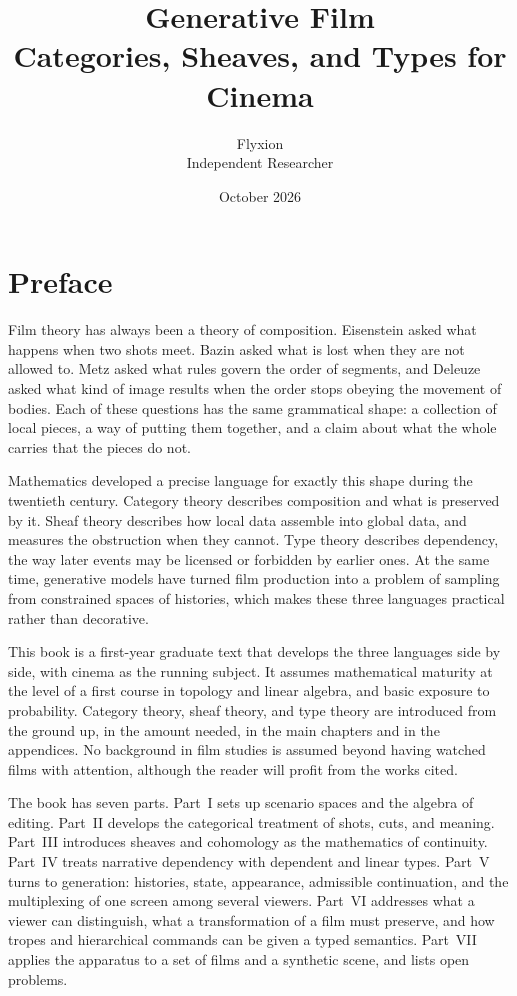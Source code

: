 \documentclass[11pt,twoside,openright]{book}
\title{\Huge\bfseries Generative Film\\[0.6ex]
\Large Categories, Sheaves, and Types for Cinema}
\author{Flyxion\\[0.3ex]\small Independent Researcher}
\date{October 2026}
\theoremstyle{plain}
\theoremstyle{definition}
\theoremstyle{remark}
\begin{document}
\frontmatter
\maketitle

\chapter*{Preface}

Film theory has always been a theory of composition. Eisenstein asked what happens when two shots meet. Bazin asked what is lost when they are not allowed to. Metz asked what rules govern the order of segments, and Deleuze asked what kind of image results when the order stops obeying the movement of bodies. Each of these questions has the same grammatical shape: a collection of local pieces, a way of putting them together, and a claim about what the whole carries that the pieces do not.

Mathematics developed a precise language for exactly this shape during the twentieth century. Category theory describes composition and what is preserved by it. Sheaf theory describes how local data assemble into global data, and measures the obstruction when they cannot. Type theory describes dependency, the way later events may be licensed or forbidden by earlier ones. At the same time, generative models have turned film production into a problem of sampling from constrained spaces of histories, which makes these three languages practical rather than decorative.

This book is a first-year graduate text that develops the three languages side by side, with cinema as the running subject. It assumes mathematical maturity at the level of a first course in topology and linear algebra, and basic exposure to probability. Category theory, sheaf theory, and type theory are introduced from the ground up, in the amount needed, in the main chapters and in the appendices. No background in film studies is assumed beyond having watched films with attention, although the reader will profit from the works cited.

The book has seven parts. Part~I sets up scenario spaces and the algebra of editing. Part~II develops the categorical treatment of shots, cuts, and meaning. Part~III introduces sheaves and cohomology as the mathematics of continuity. Part~IV treats narrative dependency with dependent and linear types. Part~V turns to generation: histories, state, appearance, admissible continuation, and the multiplexing of one screen among several viewers. Part~VI addresses what a viewer can distinguish, what a transformation of a film must preserve, and how tropes and hierarchical commands can be given a typed semantics. Part~VII applies the apparatus to a set of films and a synthetic scene, and lists open problems.
\end{document}
